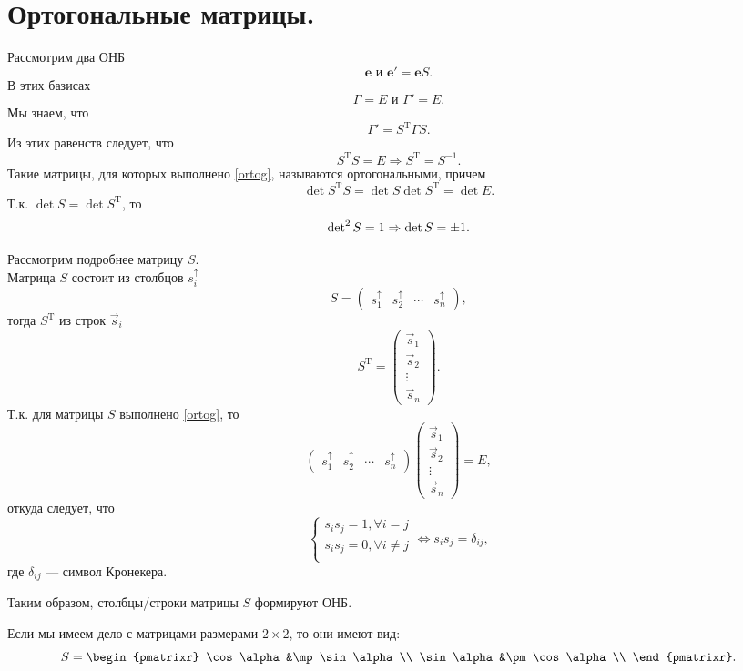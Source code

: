 \section{Ортогональные матрицы.}
Рассмотрим два ОНБ
$$
\textbf{e} \text{ и } \textbf{e}'=\textbf{e}S.
$$
В этих базисах
$$
\Gamma = E \text{ и } \Gamma' = E.
$$
Мы знаем, что
$$
\Gamma'=S^{\text{T}}\Gamma S.
$$
Из этих равенств следует, что
\begin{equation}
S^{\text{T}}S=E \Rightarrow S^{\text{T}}=S^{-1}.
\tag{$*$}
\label{ortog}
\end{equation}
Такие матрицы, для которых выполнено \eqref{ortog}, называются ортогональными, причем
$$
\det{S^{\text{T}}S}=\det{S}\det{S^{\text{T}}}=\det{E}.
$$
Т.к. $\det{S}=\det{S^{\text{T}}}$, то
$$
\operatorname{\mathop{det}}^2S=1 \Rightarrow \det{S} = \pm 1.
$$

Рассмотрим подробнее матрицу $S$.\\
Матрица $S$ состоит из столбцов $s_i^{\uparrow}$
$$
S = \begin{pmatrix}
s_1^{\uparrow}&s_2^{\uparrow}&\cdots&s_n^{\uparrow}
\end{pmatrix},
$$
тогда $S^{\text{T}}$ из строк $\vec{s}_i$
$$
S^{\text{T}} = \begin{pmatrix}
\vec{s}_1\\\vec{s}_2\\\vdots\\\vec{s}_n
\end{pmatrix}.
$$
Т.к. для матрицы $S$ выполнено \eqref{ortog}, то
$$
\begin{pmatrix}
s_1^{\uparrow}&s_2^{\uparrow}&\cdots&s_n^{\uparrow}
\end{pmatrix}
\begin{pmatrix}
\vec{s}_1\\\vec{s}_2\\\vdots\\\vec{s}_n
\end{pmatrix}
=
E,
$$
откуда следует, что
$$
\begin{cases}
s_is_j=1, \forall i=j\\
s_is_j=0, \forall i\neq j\\
\end{cases}
\Leftrightarrow
s_is_j=\delta_{ij},
$$
где $\delta_{ij}$ --- символ Кронекера.

Таким образом, столбцы/строки матрицы $S$ формируют ОНБ.

Если мы имеем дело с матрицами размерами $2\times 2$, то они имеют вид:
$$
S = \begin{pmatrixr}
\cos\alpha&\mp\sin\alpha\\
\sin\alpha&\pm\cos\alpha\\
\end{pmatrixr}.
$$
